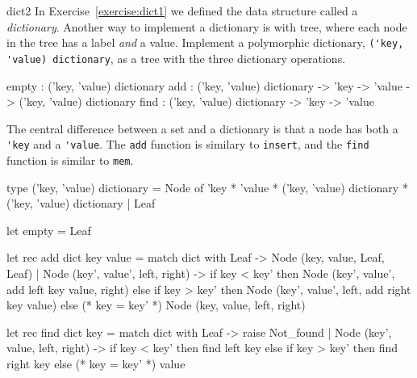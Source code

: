 %
\begin{exercise}{dict2}
In Exercise~\ref{exercise:dict1} we defined the data structure called a \emph{dictionary}.  Another
way to implement a dictionary is with tree, where each node in the tree has a label \emph{and} a
value.  Implement a polymorphic dictionary, \hbox{\lstinline/('key, 'value) dictionary/}, as a tree with
the three dictionary operations.

\begin{ocaml}
empty : ('key, 'value) dictionary
add   : ('key, 'value) dictionary -> 'key -> 'value -> ('key, 'value) dictionary
find  : ('key, 'value) dictionary -> 'key -> 'value
\end{ocaml}

\begin{answer}\ifanswers
The central difference between a set and a dictionary is that a node has both a \hbox{\lstinline/'key/} and
a \hbox{\lstinline/'value/}.  The \hbox{\lstinline/add/} function is similary to \hbox{\lstinline/insert/}, and the
\hbox{\lstinline/find/} function is similar to \hbox{\lstinline/mem/}.

\begin{ocaml}
type ('key, 'value) dictionary =
   Node of 'key * 'value * ('key, 'value) dictionary * ('key, 'value) dictionary
 | Leaf

let empty = Leaf

let rec add dict key value =
   match dict with
      Leaf -> Node (key, value, Leaf, Leaf)
    | Node (key', value', left, right) ->
         if key < key' then
            Node (key', value', add left key value, right)
         else if key > key' then
            Node (key', value', left, add right key value)
         else (* key = key' *)
            Node (key, value, left, right)
      
let rec find dict key =
   match dict with
      Leaf ->
         raise Not_found
    | Node (key', value, left, right) ->
         if key < key' then
            find left key
         else if key > key' then
            find right key
         else (* key = key' *)
            value
\end{ocaml}
\fi\end{answer}
\end{exercise}

